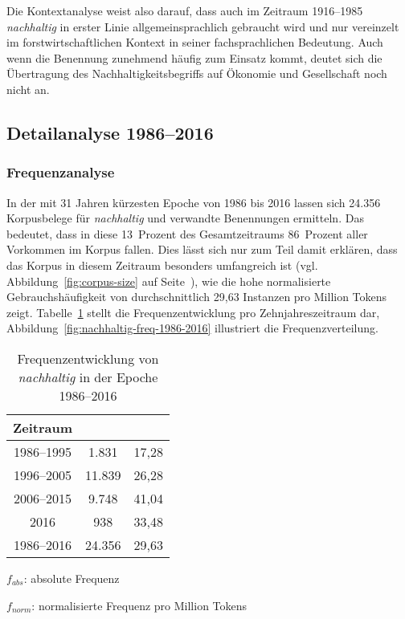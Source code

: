 \documentclass[
    german,
    a4paper,%
    12pt,%
    oneside,%
    toc=bibliography,
    final,
]{scrartcl}
\begin{document}
Die Kontextanalyse weist also darauf, dass auch im Zeitraum 1916–1985 \textit{nachhaltig} in erster Linie allgemeinsprachlich gebraucht wird und nur vereinzelt im forstwirtschaftlichen Kontext in seiner fachsprachlichen Bedeutung. Auch wenn die Benennung zunehmend häufig zum Einsatz kommt, deutet sich die Übertragung des Nachhaltigkeitsbegriffs auf Ökonomie und Gesellschaft noch nicht an.


\subsection{Detailanalyse 1986–2016}
\label{subsec:detail-1986–2016}

\subsubsection{Frequenzanalyse}

In der mit 31 Jahren kürzesten Epoche von 1986 bis 2016 lassen sich 24.356 Korpusbelege für \textit{nachhaltig} und verwandte Benennungen ermitteln. Das bedeutet, dass in diese 13~Prozent des Gesamtzeitraums 86~Prozent aller Vorkommen im Korpus fallen. Dies lässt sich nur zum Teil damit erklären, dass das Korpus in diesem Zeitraum besonders umfangreich ist (vgl. Abbildung~\ref{fig:corpus-size} auf Seite~\pageref{fig:corpus-size}), wie die hohe normalisierte Gebrauchshäufigkeit von durchschnittlich 29,63 Instanzen pro Million Tokens zeigt. Tabelle~\ref{tab:freq-epoche4} stellt die Frequenzentwicklung pro Zehnjahreszeitraum dar, Abbildung~\ref{fig:nachhaltig-freq-1986-2016} illustriert die Frequenzverteilung.

\begin{table}[h!]
	\centering
	\renewcommand{\arraystretch}{1.5}
	
	\caption{Frequenzentwicklung von \textit{nachhaltig} in der Epoche 1986–2016}
	\label{tab:freq-epoche4}
	
	\begin{threeparttable}
	
	\begin{tabular}{ccc}
	\textbf{Zeitraum} & \boldmath{$f_{abs}$} & \boldmath{$f_{norm}$} \\ \hline
	1986–1995 & 1.831 & 17,28 \\ \hline
	1996–2005 & 11.839 & 26,28 \\ \hline
	2006–2015 & 9.748 & 41,04 \\ \hline
	2016 & 938 & 33,48 \\ \hline
	1986–2016 & 24.356 & 29,63 \\ \hline
	\end{tabular} 
	
	\begin{tablenotes}
	\footnotesize
	\setlength{\itemindent}{-1.2em}
	\item $f_{abs}$: absolute Frequenz
	\item $f_{norm}$: normalisierte Frequenz pro Million Tokens
	\end{tablenotes}
	
	\end{threeparttable}
\end{table}
\end{document}
